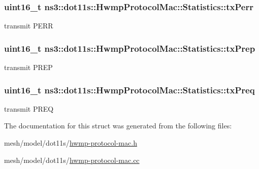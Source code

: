 \subsubsection[{\texorpdfstring{tx\+Perr}{txPerr}}]{\setlength{\rightskip}{0pt plus 5cm}uint16\+\_\+t ns3\+::dot11s\+::\+Hwmp\+Protocol\+Mac\+::\+Statistics\+::tx\+Perr}\hypertarget{structns3_1_1dot11s_1_1HwmpProtocolMac_1_1Statistics_ae4c6f524d625756de6c93b57fa89dfcd}{}\label{structns3_1_1dot11s_1_1HwmpProtocolMac_1_1Statistics_ae4c6f524d625756de6c93b57fa89dfcd}


transmit P\+E\+RR 

\subsubsection[{\texorpdfstring{tx\+Prep}{txPrep}}]{\setlength{\rightskip}{0pt plus 5cm}uint16\+\_\+t ns3\+::dot11s\+::\+Hwmp\+Protocol\+Mac\+::\+Statistics\+::tx\+Prep}\hypertarget{structns3_1_1dot11s_1_1HwmpProtocolMac_1_1Statistics_a11437ec2314cccf28b5445bd4263580b}{}\label{structns3_1_1dot11s_1_1HwmpProtocolMac_1_1Statistics_a11437ec2314cccf28b5445bd4263580b}


transmit P\+R\+EP 

\subsubsection[{\texorpdfstring{tx\+Preq}{txPreq}}]{\setlength{\rightskip}{0pt plus 5cm}uint16\+\_\+t ns3\+::dot11s\+::\+Hwmp\+Protocol\+Mac\+::\+Statistics\+::tx\+Preq}\hypertarget{structns3_1_1dot11s_1_1HwmpProtocolMac_1_1Statistics_a3cdff022127738e992b5e7573ccd1a92}{}\label{structns3_1_1dot11s_1_1HwmpProtocolMac_1_1Statistics_a3cdff022127738e992b5e7573ccd1a92}


transmit P\+R\+EQ 



The documentation for this struct was generated from the following files\+:\begin{DoxyCompactItemize}
\item 
mesh/model/dot11s/\hyperlink{hwmp-protocol-mac_8h}{hwmp-\/protocol-\/mac.\+h}\item 
mesh/model/dot11s/\hyperlink{hwmp-protocol-mac_8cc}{hwmp-\/protocol-\/mac.\+cc}\end{DoxyCompactItemize}
